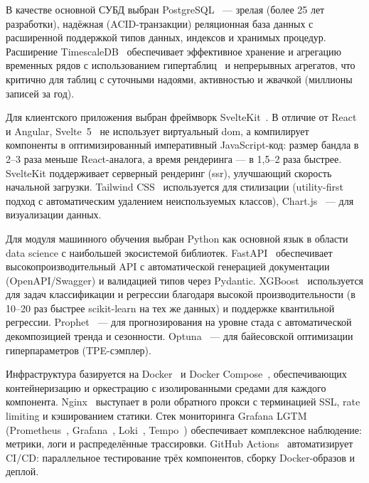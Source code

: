 В качестве основной СУБД выбран PostgreSQL~\cite{PostgreSQL} --- зрелая (более 25 лет разработки), надёжная (ACID-транзакции) реляционная база данных с расширенной поддержкой типов данных, индексов и хранимых процедур. Расширение TimescaleDB~\cite{TimescaleDB} обеспечивает эффективное хранение и агрегацию временных рядов с использованием гипертаблиц~\cite{TimescaleHypertable} и непрерывных агрегатов, что критично для таблиц с суточными надоями, активностью и жвачкой (миллионы записей за год).

Для клиентского приложения выбран фреймворк SvelteKit~\cite{SvelteKit}. В отличие от React и Angular, Svelte~5~\cite{Svelte5} не использует виртуальный \acrshort{dom}, а компилирует компоненты в оптимизированный императивный JavaScript-код: размер бандла в 2--3 раза меньше React-аналога, а время рендеринга --- в 1,5--2 раза быстрее. SvelteKit поддерживает серверный рендеринг (\acrshort{ssr}), улучшающий скорость начальной загрузки. Tailwind CSS~\cite{TailwindCSS} используется для стилизации (utility-first подход с автоматическим удалением неиспользуемых классов), Chart.js~\cite{ChartJS} --- для визуализации данных.

Для модуля машинного обучения выбран Python как основной язык в области data science с наибольшей экосистемой библиотек. FastAPI~\cite{FastAPI} обеспечивает высокопроизводительный API с автоматической генерацией документации (OpenAPI/Swagger) и валидацией типов через Pydantic. XGBoost~\cite{XGBoost} используется для задач классификации и регрессии благодаря высокой производительности (в 10--20 раз быстрее scikit-learn на тех же данных) и поддержке квантильной регрессии. Prophet~\cite{Prophet} --- для прогнозирования на уровне стада с автоматической декомпозицией тренда и сезонности. Optuna~\cite{Optuna} --- для байесовской оптимизации гиперпараметров (TPE-сэмплер).

Инфраструктура базируется на Docker~\cite{Docker} и Docker Compose~\cite{DockerCompose}, обеспечивающих контейнеризацию и оркестрацию с изолированными средами для каждого компонента. Nginx~\cite{Nginx} выступает в роли обратного прокси с терминацией SSL, rate limiting и кэшированием статики. Стек мониторинга Grafana LGTM (Prometheus~\cite{Prometheus}, Grafana~\cite{Grafana}, Loki~\cite{Loki}, Tempo~\cite{Tempo}) обеспечивает комплексное наблюдение: метрики, логи и распределённые трассировки. GitHub Actions~\cite{GHActions} автоматизирует CI/CD: параллельное тестирование трёх компонентов, сборку Docker-образов и деплой.
